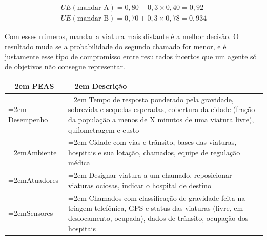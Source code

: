 \documentclass[12pt, a4paper]{article}
\begin{document}
\begin{multline*}
UE(\text{mandar A}) = 0{,}80 + 0{,}3 \times 0{,}40 = 0{,}92 \\
UE(\text{mandar B}) = 0{,}70 + 0{,}3 \times 0{,}78 = 0{,}934
\end{multline*}

Com esses números, mandar a viatura mais distante é a melhor decisão. O resultado muda se a probabilidade do segundo chamado for menor, e é justamente esse tipo de compromisso entre resultados incertos que um agente só de objetivos não consegue representar.

\begingroup
\setlength{\tabcolsep}{4.0pt}
\begin{longtable}{@{}>{\raggedright\hyphenpenalty=30\tolerance=999\emergencystretch=2em\arraybackslash}p{3.90cm}>{\raggedright\hyphenpenalty=30\tolerance=999\emergencystretch=2em\arraybackslash}p{11.10cm}@{}}
\toprule\noalign{}
PEAS & Descrição \\
\midrule\noalign{}
\endhead
\bottomrule\noalign{}
\endlastfoot
Desempenho & Tempo de resposta ponderado pela gravidade, sobrevida e sequelas esperadas, cobertura da cidade (fração da população a menos de X minutos de uma viatura livre\allowbreak ), quilometragem e custo \\
Ambiente & Cidade com vias e trânsito, bases das viaturas, hospitais e sua lotação, chamados, equipe de regulação médica \\
Atuadores & Designar viatura a um chamado, reposicionar viaturas ociosas, indicar o hospital de destino \\
Sensores & Chamados com clas\-si\-fi\-ca\-ção de gravidade feita na triagem te\-lefô\-nica, GPS e status das viaturas (livre, em deslocamento, ocupada\allowbreak ), dados de trânsito, ocupação dos hospitais \\
\end{longtable}
\endgroup
\end{document}
